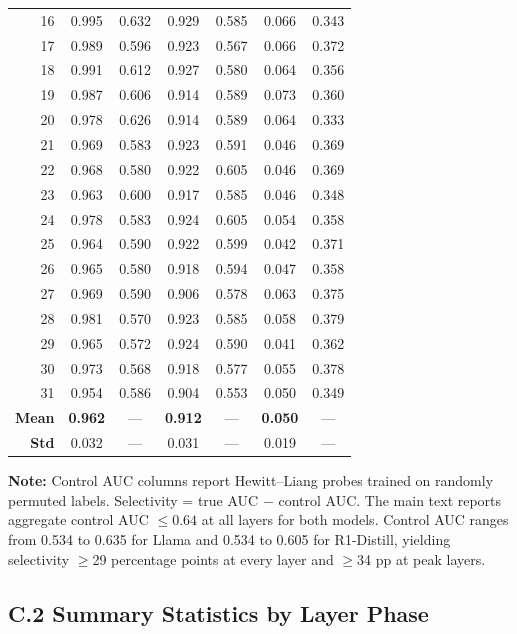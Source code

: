 \documentclass{article}
\begin{document}
\begin{longtable}{rcccccc}
16 & 0.995 & 0.632 & 0.929 & 0.585 & 0.066 & 0.343 \\
17 & 0.989 & 0.596 & 0.923 & 0.567 & 0.066 & 0.372 \\
18 & 0.991 & 0.612 & 0.927 & 0.580 & 0.064 & 0.356 \\
19 & 0.987 & 0.606 & 0.914 & 0.589 & 0.073 & 0.360 \\
20 & 0.978 & 0.626 & 0.914 & 0.589 & 0.064 & 0.333 \\
21 & 0.969 & 0.583 & 0.923 & 0.591 & 0.046 & 0.369 \\
22 & 0.968 & 0.580 & 0.922 & 0.605 & 0.046 & 0.369 \\
23 & 0.963 & 0.600 & 0.917 & 0.585 & 0.046 & 0.348 \\
24 & 0.978 & 0.583 & 0.924 & 0.605 & 0.054 & 0.358 \\
25 & 0.964 & 0.590 & 0.922 & 0.599 & 0.042 & 0.371 \\
26 & 0.965 & 0.580 & 0.918 & 0.594 & 0.047 & 0.358 \\
27 & 0.969 & 0.590 & 0.906 & 0.578 & 0.063 & 0.375 \\
28 & 0.981 & 0.570 & 0.923 & 0.585 & 0.058 & 0.379 \\
29 & 0.965 & 0.572 & 0.924 & 0.590 & 0.041 & 0.362 \\
30 & 0.973 & 0.568 & 0.918 & 0.577 & 0.055 & 0.378 \\
31 & 0.954 & 0.586 & 0.904 & 0.553 & 0.050 & 0.349 \\
\midrule
\textbf{Mean} & \textbf{0.962} & --- & \textbf{0.912} & --- & \textbf{0.050} & --- \\
\textbf{Std} & 0.032 & --- & 0.031 & --- & 0.019 & --- \\
\end{longtable}

\noindent \textbf{Note:} Control AUC columns report Hewitt--Liang probes
trained on randomly permuted labels.  Selectivity = true AUC $-$ control AUC.
The main text
reports aggregate control AUC $\leq 0.64$ at all layers for both
models.  Control AUC ranges from 0.534 to 0.635 for Llama and 0.534
to 0.605 for R1-Distill, yielding selectivity $\geq$29 percentage
points at every layer and $\geq$34 pp at peak layers.

\subsection*{C.2 Summary Statistics by Layer Phase}
\end{document}
